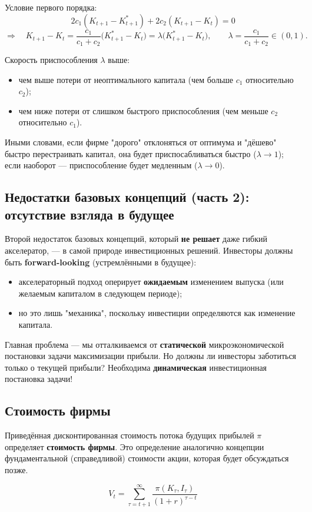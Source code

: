 \documentclass[10pt,a4paper]{article}
\begin{document}
Условие первого порядка:
$$2c_1(K_{t+1}-K_{t+1}^{*}) + 2c_2(K_{t+1}-K_t) = 0$$
$$\Rightarrow \quad K_{t+1} - K_t = \frac{c_1}{c_1+c_2}\big(K_{t+1}^{*}-K_t\big) = \lambda\big(K_{t+1}^{*}-K_t\big), \qquad \lambda = \frac{c_1}{c_1+c_2} \in (0,1).$$

\begin{intuition}
Скорость приспособления $\lambda$ выше:
\begin{itemize}[leftmargin=1.3em]
\item чем выше потери от неоптимального капитала (чем больше $c_1$ относительно $c_2$);
\item чем ниже потери от слишком быстрого приспособления (чем меньше $c_2$ относительно $c_1$).
\end{itemize}
Иными словами, если фирме "дорого" отклоняться от оптимума и "дёшево" быстро перестраивать капитал, она будет приспосабливаться быстро ($\lambda\to 1$); если наоборот — приспособление будет медленным ($\lambda\to 0$).
\end{intuition}

\subsection{Недостатки базовых концепций (часть 2): отсутствие взгляда в будущее}

Второй недостаток базовых концепций, который \textbf{не решает} даже гибкий акселератор, — в самой природе инвестиционных решений. Инвесторы должны быть \textbf{forward-looking} (устремлёнными в будущее):
\begin{itemize}[leftmargin=1.3em]
\item акселераторный подход оперирует \textbf{ожидаемым} изменением выпуска (или желаемым капиталом в следующем периоде);
\item но это лишь "механика", поскольку инвестиции определяются как изменение капитала.
\end{itemize}

Главная проблема — мы отталкиваемся от \textbf{статической} микроэкономической постановки задачи максимизации прибыли. Но должны ли инвесторы заботиться только о текущей прибыли? Необходима \textbf{динамическая} инвестиционная постановка задачи!

\subsection{Стоимость фирмы}

Приведённая дисконтированная стоимость потока будущих прибылей $\pi$ определяет \textbf{стоимость фирмы}. Это определение аналогично концепции фундаментальной (справедливой) стоимости акции, которая будет обсуждаться позже.
\begin{formulabox}
\begin{equation}
V_t = \sum_{\tau=t+1}^{\infty}\frac{\pi(K_\tau, I_\tau)}{(1+r)^{\tau-t}} \tag{8.6}
\end{equation}
\end{formulabox}
\end{document}
